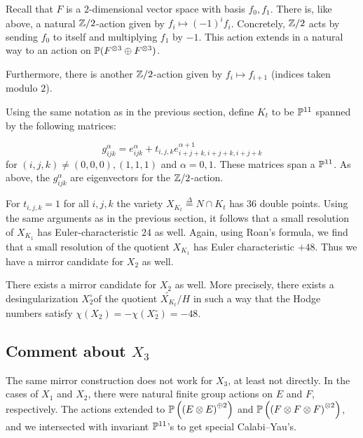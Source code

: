 Recall that $F$ is a $2$-dimensional vector space with basis $f_0, f_1$. There is, like above, a natural $\Z/2$-action given by $f_i \mapsto (-1)^i f_i$. Concretely, $\Z/2$ acts by sending $f_0$ to itself and multiplying $f_1$ by $-1$. This action extends in a natural way to an action on $\P(F^{\otimes 3} \oplus F^{\otimes 3})$.

Furthermore, there is another $\Z/2$-action given by $f_i \mapsto f_{i+1}$ (indices taken modulo $2$).

Using the same notation as in the previous section, define $K_t$ to be $\P^{11}$ 
spanned by the following matrices:

\begin{equation}
\label{eq:gijk}
g_{ijk}^\alpha = e_{ijk}^\alpha + t_{i,j,k} e_{i+j+k,i+j+k,i+j+k}^{\alpha+1}
\end{equation}
for $(i,j,k)\neq (0,0,0),(1,1,1)$ and $\alpha=0,1$. These matrices span a $\P^{11}$. As above, the $g_{ijk}^\alpha$ are eigenvectors for the $\Z/2$-action.

For $t_{i,j,k}=1$ for all $i,j,k$ the variety $X_{K_t} \stackrel \Delta =  N \cap K_t$ has $36$ double points. Using the same arguments as in the previous section, it follows that a small resolution of $X_{K_1}$ has Euler-characteristic $24$ as well. Again, using Roan's formula, we find that a small resolution of the quotient $X_{K_1}$ has Euler characteristic $+48$. Thus we have a mirror candidate for $X_2$ as well.

\begin{proposition}
There exists a mirror candidate for $X_2$ as well. More precisely, there exists a \CY desingularization $X_2^\circ $of the quotient $\widetilde {X_{K_t}}/H$ in such a way that the Hodge numbers satisfy $\chi(X_2) = -\chi(X_2^\circ) = -48$.
\end{proposition}

\subsection{Comment about $X_3$}

The same mirror construction does not work for $X_3$, at least not directly. In the cases of $X_1$ and $X_2$, there were natural finite group actions on $E$ and $F$, respectively. The actions extended to $\P\left(\left( E \otimes E\right)^{\oplus 2}\right)$ and $\P\left(\left(F \otimes F \otimes F\right)^{\otimes 2}\right)$, and we intersected with invariant $\P^{11}$'s to get special Calabi--Yau's.

